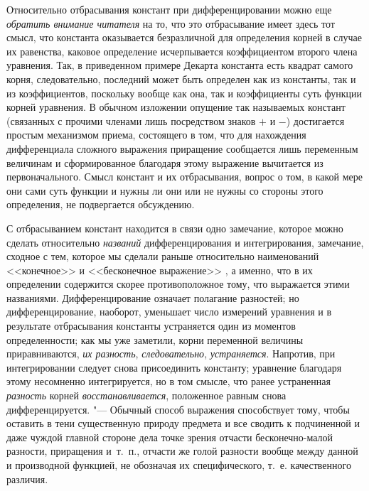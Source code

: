 Относительно отбрасывания констант при дифференцировании можно еще
{\em обратить внимание читателя} на то, что это
отбрасывание имеет здесь тот смысл, что константа оказывается безразличной
для определения корней в случае их равенства, каковое определение
исчерпывается коэффициентом второго члена уравнения. Так, в приведенном
примере Декарта константа есть квадрат самого корня, следовательно,
последний может быть определен как из константы, так и из коэффициентов,
поскольку вообще как она, так и коэффициенты суть функции корней уравнения.
В обычном изложении опущение так называемых констант (связанных с прочими
членами лишь посредством знаков $+$ и $-$) достигается простым механизмом
приема, состоящего в том, что для нахождения дифференциала сложного
выражения приращение сообщается лишь переменным величинам и сформированное
благодаря этому выражение вычитается из первоначального. Смысл констант и
их отбрасывания, вопрос о том, в какой мере они сами суть функции и нужны
ли они или не нужны со стороны этого определения, не подвергается
обсуждению.

С отбрасыванием констант находится в связи одно замечание, которое можно
сделать относительно {\em названий} дифференцирования и
интегрирования, замечание, сходное с тем, которое мы сделали раньше
относительно наименований <<конечное>> и <<бесконечное
выражение>> ,
а именно, что в их
определении содержится скорее противоположное тому, что выражается этими
названиями. Дифференцирование означает полагание разностей; но
дифференцирование, наоборот, уменьшает число измерений уравнения и в
результате отбрасывания константы устраняется один из моментов
определенности; как мы уже заметили, корни переменной величины
приравниваются, {\em их разность}, {\em следовательно},
{\em устраняется}. Напротив, при интегрировании следует
снова присоединить константу; уравнение благодаря этому несомненно
интегрируется, но в том смысле, что ранее устраненная
{\em разность} корней {\em восстанавливается}, положенное равным снова
дифференцируется. "--- Обычный способ выражения способствует тому, чтобы
оставить в тени существенную природу предмета и все сводить к подчиненной и
даже чуждой главной стороне дела точке зрения отчасти бесконечно-малой
разности, приращения и~т.~п., отчасти же голой разности вообще между данной
и производной функцией, не обозначая их специфического, т.~е. качественного
различия.

